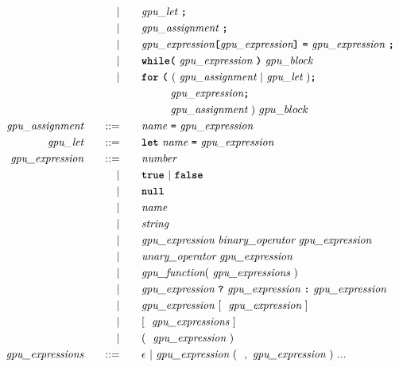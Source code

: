 \begin{alignat*}{9}
    &&  && |    &\quad &&  \textit{gpu\_let} \ \textbf{\texttt{;}} \\
    &&  && |    &\quad &&  \textit{gpu\_assignment} \ \textbf{\texttt{;}} \\
    &&  && |    &\quad &&  \textit{gpu\_expression} \textbf{\texttt{[}} \textit{gpu\_expression} \textbf{\texttt{]}}\ \textbf{\texttt{=}}\  \textit{gpu\_expression} \ \textbf{\texttt{;}} \\
    &&  && |    &\quad &&  \textbf{\texttt{while}} \textbf{\texttt{(}}\  \textit{gpu\_expression} \ \textbf{\texttt{)}} \ \textit{gpu\_block} \\
    &&  && |    &\quad &&  \textbf{\texttt{for}}\ \textbf{\texttt{(}} 
                              \  ( \ \textit{gpu\_assignment} \ | \ \textit{gpu\_let} \ )\textbf{\texttt{;}} \\
    &&  &&     &\quad && \ \ \ \ \ \ \ \  \textit{gpu\_expression} \textbf{\texttt{;}} \\
    &&  &&     &\quad && \ \ \ \ \ \ \ \  \textit{gpu\_assignment} \ ) \ gpu\_block \\
    && \textit{gpu\_assignment} 
    &&\quad ::= &\quad 
    && \textit{name} \ \textbf{\texttt{=}}\  \textit{gpu\_expression} \\
    && \textit{gpu\_let} 
    &&\quad ::= &\quad 
    && \textbf{\texttt{let}} \ \textit{name} \ \textbf{\texttt{=}}\  \textit{gpu\_expression} \\
    && \textit{gpu\_expression} 
    &&\quad ::= &\quad 
    && \textit{number} \\
    &&  && |    &\quad &&  \textbf{\texttt{true}} \ | \ \textbf{\texttt{false}} \\
    &&  && |    &\quad &&  \textbf{\texttt{null}} \\
    &&  && |    &\quad &&  \textit{name}\\
    &&  && |    &\quad &&  \textit{string}\\
    &&  && |    &\quad &&  \textit{gpu\_expression} \ \textit{binary\_operator} \ \textit{gpu\_expression} \\
    &&  && |    &\quad &&  \textit{unary\_operator} \ \textit{gpu\_expression} \\
    &&  && |    &\quad &&  \textit{gpu\_function} ( \  \textit{gpu\_expressions} \ ) \\
    &&  && |    &\quad &&  \textit{gpu\_expression} \ \textbf{\texttt{?}} \ \textit{gpu\_expression} \ \textbf{\texttt{:}} \ \textit{gpu\_expression} \\
    &&  && |    &\quad &&  \textit{gpu\_expression} \ [ \ \ \textit{gpu\_expression} \ ] \ \\
    &&  && |    &\quad && [ \ \ \textit{gpu\_expressions} \ ] \ \\
    &&  && |    &\quad && ( \ \ \textit{gpu\_expression} \ ) \ \\
    && \textit{gpu\_expressions} 
    &&\quad ::= &\quad 
    && \epsilon \ | \ \textit{gpu\_expression} \ ( \ \ , \ \textit{gpu\_expression} \ )
    \ {...}
    \end{alignat*}

